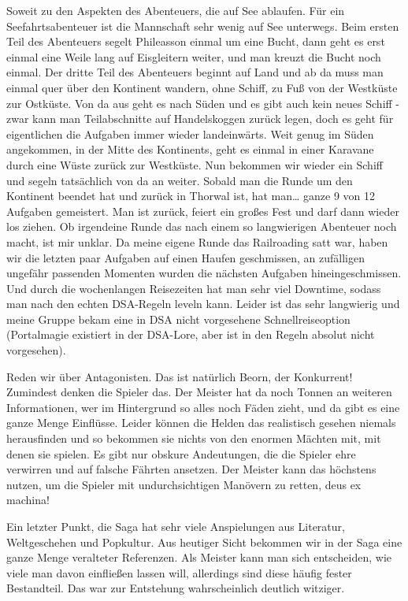 \documentclass[final]{multiversum}
\begin{document}
Soweit zu den Aspekten des Abenteuers, die auf See ablaufen. Für ein
Seefahrtsabenteuer ist die Mannschaft sehr wenig auf See unterwegs. Beim ersten
Teil des Abenteuers segelt Phileasson einmal um eine Bucht, dann geht es erst
einmal eine Weile lang auf Eisgleitern weiter, und man kreuzt die Bucht noch
einmal. Der dritte Teil des Abenteuers beginnt auf Land und ab da muss man
einmal quer über den Kontinent wandern, ohne Schiff, zu Fuß von der Westküste
zur Ostküste. Von da aus geht es nach Süden und es gibt auch kein neues Schiff -
zwar kann man Teilabschnitte auf Handelskoggen zurück legen, doch es geht für
eigentlichen die Aufgaben immer wieder landeinwärts. Weit genug im Süden
angekommen, in der Mitte des Kontinents, geht es einmal in einer Karavane durch
eine Wüste zurück zur Westküste. Nun bekommen wir wieder ein Schiff und segeln
tatsächlich von da an weiter. Sobald man die Runde um den Kontinent beendet hat
und zurück in Thorwal ist, hat man… ganze 9 von 12 Aufgaben gemeistert. Man ist
zurück, feiert ein großes Fest und darf dann wieder los ziehen. Ob irgendeine
Runde das nach einem so langwierigen Abenteuer noch macht, ist mir unklar. Da
meine eigene Runde das Railroading satt war, haben wir die letzten paar Aufgaben
auf einen Haufen geschmissen, an zufälligen ungefähr passenden Momenten wurden
die nächsten Aufgaben hineingeschmissen. Und durch die wochenlangen Reisezeiten
hat man sehr viel Downtime, sodass man nach den echten DSA-Regeln leveln kann.
Leider ist das sehr langwierig und meine Gruppe bekam eine in DSA nicht
vorgesehene Schnellreiseoption (Portalmagie existiert in der DSA-Lore, aber ist
in den Regeln absolut nicht vorgesehen).

Reden wir über Antagonisten. Das ist natürlich Beorn, der Konkurrent! Zumindest
denken die Spieler das. Der Meister hat da noch Tonnen an weiteren
Informationen, wer im Hintergrund so alles noch Fäden zieht, und da gibt es eine
ganze Menge Einflüsse. Leider können die Helden das realistisch gesehen niemals
herausfinden und so bekommen sie nichts von den enormen Mächten mit, mit denen
sie spielen. Es gibt nur obskure Andeutungen, die die Spieler ehre verwirren und
auf falsche Fährten ansetzen. Der Meister kann das höchstens nutzen, um die
Spieler mit undurchsichtigen Manövern zu retten, deus ex machina!

Ein letzter Punkt, die Saga hat sehr viele Anspielungen aus Literatur,
Weltgeschehen und Popkultur. Aus heutiger Sicht bekommen wir in der Saga eine
ganze Menge veralteter Referenzen. Als Meister kann man sich entscheiden, wie
viele man davon einfließen lassen will, allerdings sind diese häufig fester
Bestandteil. Das war zur Entstehung wahrscheinlich deutlich witziger.
\end{document}
